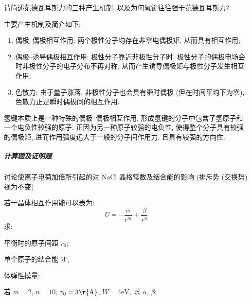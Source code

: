 \documentclass[UTF8]{ctexart}
\newenvironment{Answer}{}{}
\begin{document}
\begin{Question}
            \item 请简述范德瓦耳斯力的三种产生机制, 以及为何氢键往往强于范德瓦耳斯力?

\begin{Answer}
    \begin{Solve}[Answer:]
        \hspace*{2em}主要产生机制及简介如下:
            \begin{enumerate}
                \item 偶极--偶极相互作用: 两个极性分子均存在非零电偶极矩, 从而具有相互作用;
                \item 偶极--诱导偶极相互作用: 极性分子靠近非极性分子时, 极性分子的偶极电场会时非极性分子的电子分布不再对称, 从而产生诱导偶极矩与极性分子发生相互作用;
                \item 色散力: 由于量子涨落, 非极性分子也会具有瞬时偶极 (但在时间平均下为零), 色散力正是瞬时偶极间的相互作用.
            \end{enumerate}

        \hspace*{2em}氢键本质上是一种特殊的偶极--偶极相互作用, 形成氢键的分子中包含了氢原子和一个电负性较强的原子. 正因为另一种原子较强的电负性, 使得整个分子具有较强的偶极矩, 进而作用强度远大于一般的分子间作用力, 且具有较强的方向性.
    \end{Solve}
\end{Answer}
        \end{Question}

    \subparagraph{计算题及证明题}
        \begin{Question}
            \item 讨论使离子电荷加倍所引起的对 NaCl 晶格常数及结合能的影响 (排斥势 (交换势) 视为不变)
            \item 若一晶体相互作用能可以表为:
                    \begin{equation*}
                        U = - \dfrac{\alpha}{r^m} + \dfrac{\beta}{r^n}
                    \end{equation*}
                求:
                    \begin{Question}
                        \item 平衡时的原子间距 $r_0$;
                        \item 单个原子的结合能 $W$;
                        \item 体弹性摸量;
                        \item 若 $m = 2$, $n = 10$, $r_0 = 3 \mathrm{\r{A}}$, $W = 4 \mathrm{eV}$, 求 $\alpha$, $\beta$;
                    \end{Question}
        \end{Question}
\end{document}
